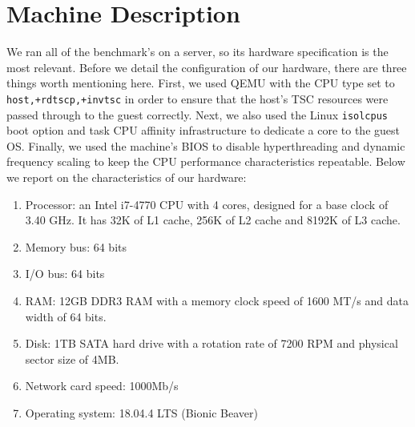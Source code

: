 \section{Machine Description}

We ran all of the benchmark's on a server, so its hardware
specification is the most relevant.  Before we detail the configuration of our hardware, there are three things worth mentioning here.
First, we used QEMU with the CPU type
set to \verb|host,+rdtscp,+invtsc| in order to ensure that the host's
TSC resources were passed through to the guest correctly. 
Next, we also
used the Linux \verb|isolcpus| boot option and task CPU affinity infrastructure to
dedicate a core to the guest OS.
Finally, we used the machine's BIOS to disable hyperthreading and
dynamic frequency scaling to keep the CPU performance characteristics repeatable.
Below we report on the characteristics of our hardware:
\begin{enumerate}
    \item Processor: an Intel i7-4770 CPU with 4 cores, designed for a base clock of 3.40 GHz. 
    It has 32K of L1 cache, 256K of L2 cache and 8192K of L3 cache.
    \item Memory bus: 64 bits
    \item I/O bus: 64 bits
    \item RAM: 12GB DDR3 RAM with a memory clock speed of 1600 MT/s and data width of 64 bits.
    \item Disk: 1TB SATA hard drive with a rotation rate of 7200 RPM and physical sector size of 4MB.
    \item Network card speed: 1000Mb/s
    \item Operating system: 18.04.4 LTS (Bionic Beaver)
\end{enumerate}
